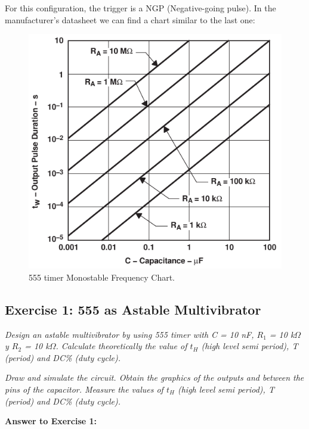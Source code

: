For this configuration, the trigger is a NGP (Negative-going pulse). In the manufacturer's datasheet we can find a chart similar to the last one: \medskip

\begin{figure}[H]
    \centering
    \includegraphics[scale = 0.8]{Graphics/VHDL/Practice 2/GRAPHICS/555/GRAPHS/DATASHEETS/MONOSTABLE_FREQ.pdf}
    \caption{555 timer Monostable Frequency Chart. ~\autocite{555_DS}}
    \label{fig:MONOSTABLE_FREQ}
\end{figure}

\clearpage


\subsection{Exercise 1: 555 as Astable Multivibrator}

\textit{Design an astable multivibrator by using 555 timer with C = 10 nF, $R_1$ = 10 k$\Omega$ y $R_2$ = 10 k$\Omega$. Calculate theoretically the value of $t_H$ (high level semi period), T (period) and DC\% (duty cycle).}\medskip

\textit{Draw and simulate the circuit. Obtain the graphics of the outputs and between the pins of the capacitor. Measure the values of $t_H$ (high level semi period), T (period) and DC\% (duty cycle).}\bigskip

\textbf{\large Answer to Exercise 1:}\medskip


